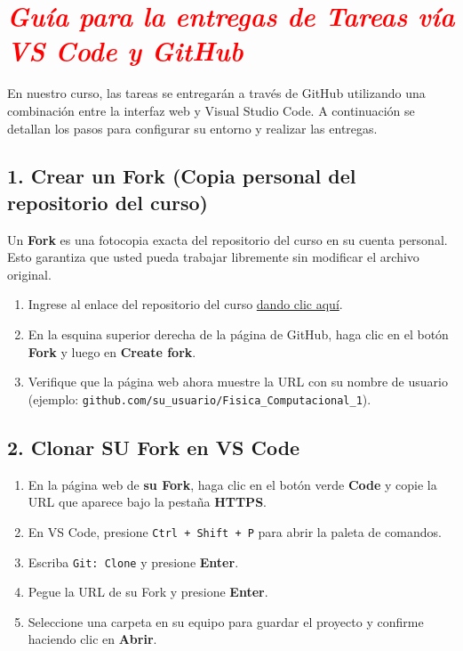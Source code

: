 \documentclass[12pt]{article}
\begin{document}
\section*{\textcolor{red}{\textit{Guía para la entregas de Tareas vía VS Code y GitHub}}}
En nuestro curso, las tareas se entregarán a través de GitHub utilizando una combinación entre 
la interfaz web y Visual Studio Code. 
A continuación se detallan los pasos para configurar su entorno y realizar las entregas.

\subsection*{1. Crear un Fork (Copia personal del repositorio del curso)}
Un \textbf{Fork} es una fotocopia exacta del repositorio del curso en su cuenta personal. 
Esto garantiza que usted pueda trabajar libremente sin modificar el archivo original.

\begin{enumerate}[label=\arabic*)]
    \item Ingrese al enlace del repositorio del curso 
    \href{https://github.com/longas14/Fisica_Computacional_1}{dando clic aquí}.
    \item En la esquina superior derecha de la página de GitHub, haga clic en el botón 
    \textbf{Fork} y luego en \textbf{Create fork}.
    \item Verifique que la página web ahora muestre la URL con su nombre de usuario\\
    (ejemplo: \texttt{github.com/su\_usuario/Fisica\_Computacional\_1}).
\end{enumerate}

\subsection*{2. Clonar SU Fork en VS Code}
\begin{enumerate}[label=\arabic*)]
    \item En la página web de \textbf{su Fork}, haga clic en el botón verde \textbf{Code} y copie la URL que aparece bajo la pestaña \textbf{HTTPS}.
    \item En VS Code, presione \lstinline|Ctrl + Shift + P| para abrir la paleta de comandos.
    \item Escriba \lstinline|Git: Clone| y presione \textbf{Enter}.
    \item Pegue la URL de su Fork y presione \textbf{Enter}.
    \item Seleccione una carpeta en su equipo para guardar el proyecto y confirme haciendo clic en \textbf{Abrir}.
\end{enumerate}
\end{document}
